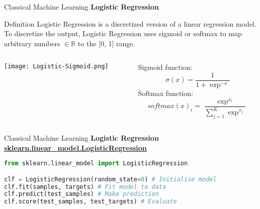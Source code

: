 \documentclass{beamer}
\begin{document}
\begin{frame}[fragile]{Classical Machine Learning}
    \textbf{Logistic Regression}
    \begin{block}{Definition}
        Logistic Regression is a discretized version of a linear regression model. To discretize the output, Logistic Regression uses sigmoid or softmax to map arbitrary numbers $\in \mathbb{R}$ to the [0, 1] range.
        \begin{columns}[T]
            \begin{column}{.40\textwidth}
                \begin{center}
                    \texttt{[image: Logistic-Sigmoid.png]}
                \end{center}
            \end{column}%
            \hfill%
            \begin{column}{.40\textwidth}
                Sigmoid function:
                \begin{equation*}
                    \sigma(x) = \frac{1}{1 + \exp^{-x}}
                \end{equation*}
                Softmax function:
                \begin{equation*}
                    softmax(x)_{i} = \frac{\exp^{x_{i}}}{\sum_{j=1}^{K}\exp^{x_{j}}}
                \end{equation*}
            \end{column}%
        \end{columns}
    \end{block}
\end{frame}
\begin{frame}[fragile]{Classical Machine Learning}
    \textbf{Logistic Regression}
    \href{https://scikit-learn.org/stable/modules/generated/sklearn.linear_model.LogisticRegression.html}{\textbf{\underline{sklearn.linear\_model.LogisticRegression}}}
    \begin{example}
        \begin{lstlisting}[language=Python]
from sklearn.linear_model import LogisticRegression

clf = LogisticRegression(random_state=0) # Initialise model
clf.fit(samples, targets) # Fit model to data
clf.predict(test_samples) # Make prediction
clf.score(test_samples, test_targets) # Evaluate
        \end{lstlisting}
    \end{example}
\end{frame}
\end{document}
